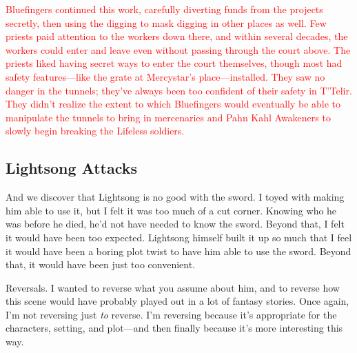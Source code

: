\textcolor{red}{
Bluefingers continued this work, carefully diverting funds from the projects secretly, then using the digging to mask digging in other places as well. Few priests paid attention to the workers down there, and within several decades, the workers could enter and leave even without passing through the court above. The priests liked having secret ways to enter the court themselves, though most had safety features—like the grate at Mercystar’s place—installed. They saw no danger in the tunnels; they’ve always been too confident of their safety in T’Telir. They didn’t realize the extent to which Bluefingers would eventually be able to manipulate the tunnels to bring in mercenaries and Pahn Kahl Awakeners to slowly begin breaking the Lifeless soldiers.
}

\subsection*{Lightsong Attacks}

And we discover that Lightsong is no good with the sword. I toyed with making him able to use it, but I felt it was too much of a cut corner. Knowing who he was before he died, he’d not have needed to know the sword. Beyond that, I felt it would have been too expected. Lightsong himself built it up so much that I feel it would have been a boring plot twist to have him able to use the sword. Beyond that, it would have been just too convenient.

Reversals. I wanted to reverse what you assume about him, and to reverse how this scene would have probably played out in a lot of fantasy stories. Once again, I’m not reversing just \textit{to} reverse. I’m reversing because it’s appropriate for the characters, setting, and plot—and then finally because it’s more interesting this way.



